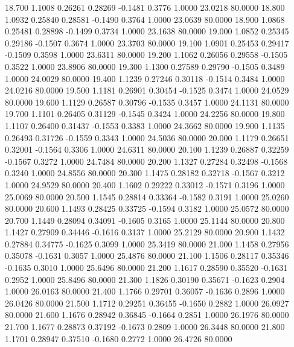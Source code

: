   18.700   1.1008   0.26261   0.28269  -0.1481   0.3776   1.0000  23.0218  80.0000
  18.800   1.0932   0.25840   0.28581  -0.1490   0.3764   1.0000  23.0639  80.0000
  18.900   1.0868   0.25481   0.28898  -0.1499   0.3734   1.0000  23.1638  80.0000
  19.000   1.0852   0.25345   0.29186  -0.1507   0.3674   1.0000  23.3703  80.0000
  19.100   1.0901   0.25453   0.29417  -0.1509   0.3598   1.0000  23.6311  80.0000
  19.200   1.1062   0.26056   0.29558  -0.1505   0.3522   1.0000  23.8906  80.0000
  19.300   1.1300   0.27589   0.29790  -0.1505   0.3489   1.0000  24.0029  80.0000
  19.400   1.1239   0.27246   0.30118  -0.1514   0.3484   1.0000  24.0216  80.0000
  19.500   1.1181   0.26901   0.30454  -0.1525   0.3474   1.0000  24.0529  80.0000
  19.600   1.1129   0.26587   0.30796  -0.1535   0.3457   1.0000  24.1131  80.0000
  19.700   1.1101   0.26405   0.31129  -0.1545   0.3424   1.0000  24.2256  80.0000
  19.800   1.1107   0.26400   0.31437  -0.1553   0.3383   1.0000  24.3662  80.0000
  19.900   1.1135   0.26493   0.31726  -0.1559   0.3343   1.0000  24.5036  80.0000
  20.000   1.1179   0.26651   0.32001  -0.1564   0.3306   1.0000  24.6311  80.0000
  20.100   1.1239   0.26887   0.32259  -0.1567   0.3272   1.0000  24.7484  80.0000
  20.200   1.1327   0.27284   0.32498  -0.1568   0.3240   1.0000  24.8556  80.0000
  20.300   1.1475   0.28182   0.32718  -0.1567   0.3212   1.0000  24.9529  80.0000
  20.400   1.1602   0.29222   0.33012  -0.1571   0.3196   1.0000  25.0069  80.0000
  20.500   1.1545   0.28814   0.33364  -0.1582   0.3191   1.0000  25.0260  80.0000
  20.600   1.1493   0.28425   0.33725  -0.1594   0.3182   1.0000  25.0572  80.0000
  20.700   1.1449   0.28094   0.34091  -0.1605   0.3165   1.0000  25.1144  80.0000
  20.800   1.1427   0.27909   0.34446  -0.1616   0.3137   1.0000  25.2129  80.0000
  20.900   1.1432   0.27884   0.34775  -0.1625   0.3099   1.0000  25.3419  80.0000
  21.000   1.1458   0.27956   0.35078  -0.1631   0.3057   1.0000  25.4876  80.0000
  21.100   1.1506   0.28117   0.35346  -0.1635   0.3010   1.0000  25.6496  80.0000
  21.200   1.1617   0.28590   0.35520  -0.1631   0.2952   1.0000  25.8496  80.0000
  21.300   1.1826   0.30190   0.35671  -0.1623   0.2904   1.0000  26.0163  80.0000
  21.400   1.1766   0.29701   0.36057  -0.1636   0.2896   1.0000  26.0426  80.0000
  21.500   1.1712   0.29251   0.36455  -0.1650   0.2882   1.0000  26.0927  80.0000
  21.600   1.1676   0.28942   0.36845  -0.1664   0.2851   1.0000  26.1976  80.0000
  21.700   1.1677   0.28873   0.37192  -0.1673   0.2809   1.0000  26.3448  80.0000
  21.800   1.1701   0.28947   0.37510  -0.1680   0.2772   1.0000  26.4726  80.0000
